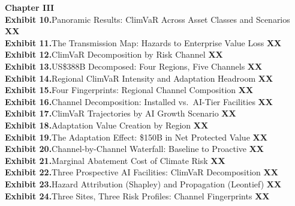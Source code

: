 {\noindent\textbf{\color{SEGreen}Chapter III}\\[4pt]
\noindent\textbf{\color{SEGreen}Exhibit 10.}\enspace Panoramic Results: ClimVaR Across Asset Classes and Scenarios \dotfill \textbf{XX}\\[3pt]
\noindent\textbf{\color{SEGreen}Exhibit 11.}\enspace The Transmission Map: Hazards to Enterprise Value Loss \dotfill \textbf{XX}\\[3pt]
\noindent\textbf{\color{SEGreen}Exhibit 12.}\enspace ClimVaR Decomposition by Risk Channel \dotfill \textbf{XX}\\[3pt]
\noindent\textbf{\color{SEGreen}Exhibit 13.}\enspace US\$388B Decomposed: Four Regions, Five Channels \dotfill \textbf{XX}\\[3pt]
\noindent\textbf{\color{SEGreen}Exhibit 14.}\enspace Regional ClimVaR Intensity and Adaptation Headroom \dotfill \textbf{XX}\\[3pt]
\noindent\textbf{\color{SEGreen}Exhibit 15.}\enspace Four Fingerprints: Regional Channel Composition \dotfill \textbf{XX}\\[3pt]
\noindent\textbf{\color{SEGreen}Exhibit 16.}\enspace Channel Decomposition: Installed vs.\ AI-Tier Facilities \dotfill \textbf{XX}\\[3pt]
\noindent\textbf{\color{SEGreen}Exhibit 17.}\enspace ClimVaR Trajectories by AI Growth Scenario \dotfill \textbf{XX}\\[3pt]
\noindent\textbf{\color{SEGreen}Exhibit 18.}\enspace Adaptation Value Creation by Region \dotfill \textbf{XX}\\[3pt]
\noindent\textbf{\color{SEGreen}Exhibit 19.}\enspace The Adaptation Effect: \$150B in Net Protected Value \dotfill \textbf{XX}\\[3pt]
\noindent\textbf{\color{SEGreen}Exhibit 20.}\enspace Channel-by-Channel Waterfall: Baseline to Proactive \dotfill \textbf{XX}\\[3pt]
\noindent\textbf{\color{SEGreen}Exhibit 21.}\enspace Marginal Abatement Cost of Climate Risk \dotfill \textbf{XX}\\[3pt]
\noindent\textbf{\color{SEGreen}Exhibit 22.}\enspace Three Prospective AI Facilities: ClimVaR Decomposition \dotfill \textbf{XX}\\[3pt]
\noindent\textbf{\color{SEGreen}Exhibit 23.}\enspace Hazard Attribution (Shapley) and Propagation (Leontief) \dotfill \textbf{XX}\\[3pt]
\noindent\textbf{\color{SEGreen}Exhibit 24.}\enspace Three Sites, Three Risk Profiles: Channel Fingerprints \dotfill \textbf{XX}\\[3pt]

}

